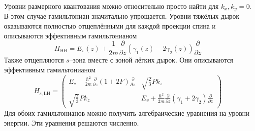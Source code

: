 Уровни размерного квантования можно относительно просто найти для $k_x, k_y = 0$. В этом 
случае гамильтониан значитально упрощается. Уровни тяжёлых дырок оказываются полностью
отщеплёнными для каждой проекции спина и описываются эффективным гамильтонианом
\begin{equation}
    H_{\mathrm{HH}} = E_v(z) + \frac{1}{2m}
                        \frac{\partial}{\partial z} 
                        (\gamma_1(z) - 2\gamma_2(z)) 
                        \frac{\partial}{\partial z} 
\end{equation}
Также отщепляются $s$--зона вместе с зоной лёгких дырок. Они описываются эффективным
гамильтонианом 
\begin{equation}
    H_{\mathrm{s,LH}} = \begin{pmatrix}
                            E_c - \frac{\hbar^2}{2m}
                                 \frac{\partial}{\partial z}(1 + 2F) 
                                 \frac{\partial}{\partial z} &
                                 \sqrt{\frac{2}{3}}P k_z \\
                                 \sqrt{\frac{2}{3}}P k_z &
                                 E_v +  \frac{\hbar^2}{2m}
                                 \frac{\partial}{\partial z}(\gamma_1 + 2\gamma_2)
                                 \frac{\partial}{\partial z} 
                        \end{pmatrix}
\end{equation}
Для обоих гамильтонианов можно получить алгебраические уравнения на уровни энергии. Эти
уравнения решаются численно.
